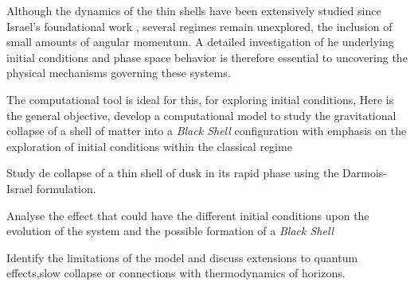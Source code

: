 Although the dynamics of the thin shells have been extensively studied since Israel's foundational work \cite{israel1966,israel1967}, several regimes remain unexplored, the inclusion of small amounts of angular momentum. A detailed investigation of he underlying initial conditions and phase space behavior is therefore essential to uncovering the physical mechanisms governing these systems.



The computational tool is ideal for this, for exploring initial conditions, Here is the general objective, develop a computational model to study the gravitational collapse of a shell of matter into a \textit{Black Shell} configuration with emphasis on the exploration of
initial conditions within the classical regime



Study de collapse of a thin shell of dusk in its rapid phase using the Darmois-Israel formulation.

Analyse the effect that could have the different initial conditions upon the evolution of the system and the possible formation of a \textit{Black Shell}

Identify the limitations of the model and discuss extensions to quantum effects,slow collapse or connections with thermodynamics of horizons.





